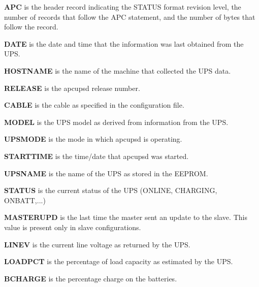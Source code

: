 \begin{description}

\item {\bf APC}
is the header record indicating the STATUS format revision level, the number
of records that follow the APC statement, and the number of bytes that follow
the record.  

\item {\bf DATE}
is the date and time that the information was last obtained from the UPS.  

\item {\bf HOSTNAME}
is the name of the machine that collected the UPS data.  

\item {\bf RELEASE}
is the apcupsd release number.  

\item {\bf CABLE}
is the cable as specified in the configuration file.  

\item {\bf MODEL}
is the UPS model as derived from information from the UPS.  

\item {\bf UPSMODE}
is the mode in which apcupsd is operating.  

\item {\bf STARTTIME}
is the time/date that apcupsd was started.  

\item {\bf UPSNAME}
is the name of the UPS as stored in the EEPROM.  

\item {\bf STATUS}
is the current status of the UPS (ONLINE, CHARGING, ONBATT,...)  

\item {\bf MASTERUPD}
is the last time the master sent an update to the slave. This value is present
only in slave configurations.  

\item {\bf LINEV}
is the current line voltage as returned by the UPS.  

\item {\bf LOADPCT}
is the percentage of load capacity as estimated by the UPS.  

\item {\bf BCHARGE}
is the percentage charge on the batteries.  


\end{description}
